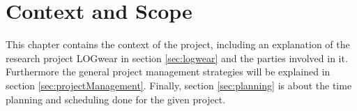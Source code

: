 \chapter{Context and Scope}\label{cha:context}
This chapter contains the context of the project, including an explanation of the research project LOGwear in section \ref{sec:logwear} and the parties involved in it. Furthermore the general project management strategies will be explained in section \ref{sec:projectManagement}. %
Finally, section \ref{sec:planning} is about the time planning and scheduling done for the given project.

%
%


